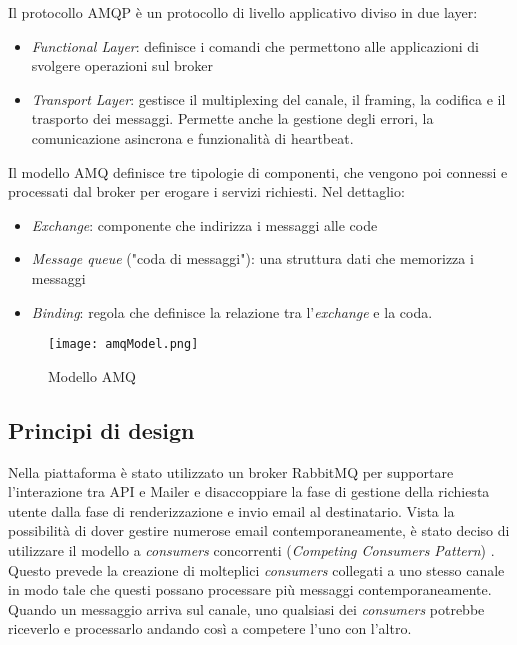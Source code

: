 Il protocollo AMQP è un protocollo di livello applicativo diviso in due layer:
\begin{itemize}
    \itemsep0em
    \item \textit{Functional Layer}: definisce i comandi che permettono alle applicazioni di svolgere operazioni sul broker
    \item \textit{Transport Layer}:  gestisce il multiplexing del canale, il framing, la codifica e il trasporto dei messaggi. Permette anche la gestione degli errori, la comunicazione asincrona e funzionalità di heartbeat.
\end{itemize}

Il modello AMQ definisce tre tipologie di componenti, che vengono poi connessi e processati dal broker per erogare i servizi richiesti.
Nel dettaglio:
\begin{itemize}
    \itemsep0em
    \item \textit{Exchange}: componente che indirizza i messaggi alle code
    \item \textit{Message queue} ("coda di messaggi"): una struttura dati che memorizza i messaggi
    \item \textit{Binding}: regola che definisce la relazione tra l'\textit{exchange} e la coda.
\end{itemize}

\begin{figure}[h]
    \centering
    \texttt{[image: amqModel.png]}
    \caption{Modello AMQ}
    \label{fig:AmqModel}
\end{figure}


\subsection{Principi di design}
Nella piattaforma è stato utilizzato un broker RabbitMQ per supportare l'interazione tra API e Mailer e
disaccoppiare la fase di gestione della richiesta utente dalla fase di renderizzazione e invio email al destinatario.
Vista la possibilità di dover gestire numerose email contemporaneamente, è stato deciso di utilizzare il modello a \textit{consumers} concorrenti (\textit{Competing Consumers Pattern}) \cite{CompetingConsumers}.
Questo prevede la creazione di molteplici \textit{consumers} collegati a uno stesso canale in modo tale che questi possano processare più messaggi contemporaneamente.
Quando un messaggio arriva sul canale, uno qualsiasi dei \textit{consumers} potrebbe riceverlo e processarlo andando così a competere l'uno con l'altro.

